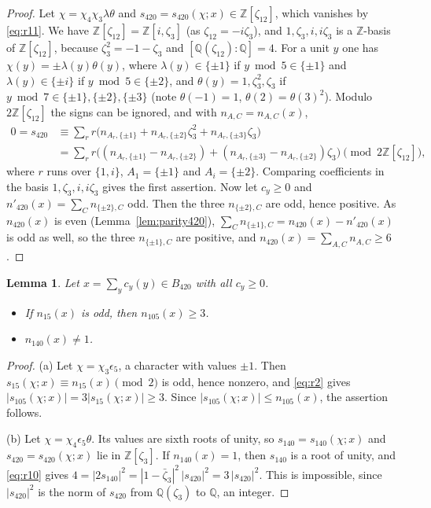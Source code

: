 \documentclass[11pt]{amsart}
\newtheorem{lemma}[theorem]{Lemma}
\theoremstyle{definition}
\theoremstyle{remark}
\numberwithin{equation}{section}
\newcommand{\Q}{\mathbb{Q}}
\newcommand{\Z}{\mathbb{Z}}
\begin{document}
\begin{proof}
Let $\chi=\chi_4\chi_3\lambda\theta$ and $s_{420}=s_{420}(\chi;x)\in\Z[\zeta_{12}]$, which vanishes by \eqref{eq:r11}. We have $\Z[\zeta_{12}]=\Z[i,\zeta_3]$ (as $\zeta_{12}=-i\zeta_3$), and $1,\zeta_3,i,i\zeta_3$ is a $\Z$-basis of $\Z[\zeta_{12}]$, because $\zeta_3^2=-1-\zeta_3$ and $[\Q(\zeta_{12}):\Q]=4$. For a unit $y$ one has $\chi(y)=\pm\lambda(y)\theta(y)$, where $\lambda(y)\in\{\pm1\}$ if $y\bmod5\in\{\pm1\}$ and $\lambda(y)\in\{\pm i\}$ if $y\bmod5\in\{\pm2\}$, and $\theta(y)=1,\zeta_3^2,\zeta_3$ if $y\bmod7\in\{\pm1\},\{\pm2\},\{\pm3\}$ (note $\theta(-1)=1$, $\theta(2)=\theta(3)^2$). Modulo $2\Z[\zeta_{12}]$ the signs can be ignored, and with $n_{A,C}=n_{A,C}(x)$,
\[
\begin{aligned}
0=s_{420}&\equiv\sum_{r}r\bigl(n_{A_r,\{\pm1\}}+n_{A_r,\{\pm2\}}\zeta_3^2+n_{A_r,\{\pm3\}}\zeta_3\bigr)\\
&=\sum_rr\bigl((n_{A_r,\{\pm1\}}-n_{A_r,\{\pm2\}})+(n_{A_r,\{\pm3\}}-n_{A_r,\{\pm2\}})\zeta_3\bigr)\pmod{2\Z[\zeta_{12}]},
\end{aligned}
\]
where $r$ runs over $\{1,i\}$, $A_1=\{\pm1\}$ and $A_i=\{\pm2\}$. Comparing coefficients in the basis $1,\zeta_3,i,i\zeta_3$ gives the first assertion. Now let $c_y\ge0$ and $n'_{420}(x)=\sum_Cn_{\{\pm2\},C}$ odd. Then the three $n_{\{\pm2\},C}$ are odd, hence positive. As $n_{420}(x)$ is even (Lemma~\ref{lem:parity420}), $\sum_Cn_{\{\pm1\},C}=n_{420}(x)-n'_{420}(x)$ is odd as well, so the three $n_{\{\pm1\},C}$ are positive, and $n_{420}(x)=\sum_{A,C}n_{A,C}\ge6$.
\end{proof}

\begin{lemma}\label{lem:norm420}
Let $x=\sum_yc_y(y)\in B_{420}$ with all $c_y\ge0$.
\begin{itemize}
\item[(a)] If $n_{15}(x)$ is odd, then $n_{105}(x)\ge3$.
\item[(b)] $n_{140}(x)\ne1$.
\end{itemize}
\end{lemma}

\begin{proof}
(a) Let $\chi=\chi_3\epsilon_5$, a character with values $\pm1$. Then $s_{15}(\chi;x)\equiv n_{15}(x)\pmod 2$ is odd, hence nonzero, and \eqref{eq:r2} gives $|s_{105}(\chi;x)|=3|s_{15}(\chi;x)|\ge3$. Since $|s_{105}(\chi;x)|\le n_{105}(x)$, the assertion follows.

(b) Let $\chi=\chi_4\epsilon_5\theta$. Its values are sixth roots of unity, so $s_{140}=s_{140}(\chi;x)$ and $s_{420}=s_{420}(\chi;x)$ lie in $\Z[\zeta_3]$. If $n_{140}(x)=1$, then $s_{140}$ is a root of unity, and \eqref{eq:r10} gives $4=|2s_{140}|^2=|1-\bar\zeta_3|^2\,|s_{420}|^2=3\,|s_{420}|^2$. This is impossible, since $|s_{420}|^2$ is the norm of $s_{420}$ from $\Q(\zeta_3)$ to $\Q$, an integer.
\end{proof}
\end{document}
